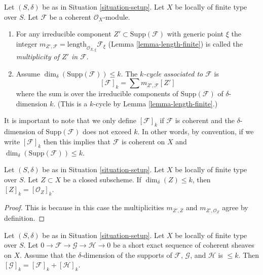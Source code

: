 \begin{definition}
\label{definition-cycle-associated-to-coherent-sheaf}
Let $(S, \delta)$ be as in Situation \ref{situation-setup}.
Let $X$ be locally of finite type over $S$.
Let $\mathcal{F}$ be a coherent $\mathcal{O}_X$-module.
\begin{enumerate}
\item For any irreducible component $Z' \subset \text{Supp}(\mathcal{F})$
with generic point $\xi$ the integer
$m_{Z', \mathcal{F}} = \text{length}_{\mathcal{O}_{X, \xi}} \mathcal{F}_\xi$
(Lemma \ref{lemma-length-finite})
is called the {\it multiplicity of $Z'$ in $\mathcal{F}$}.
\item Assume $\dim_\delta(\text{Supp}(\mathcal{F})) \leq k$.
The {\it $k$-cycle associated to $\mathcal{F}$} is
$$
[\mathcal{F}]_k
=
\sum m_{Z', \mathcal{F}}[Z']
$$
where the sum is over the irreducible components of
$\text{Supp}(\mathcal{F})$ of $\delta$-dimension $k$.
(This is a $k$-cycle by Lemma \ref{lemma-length-finite}.)
\end{enumerate}
\end{definition}

\noindent
It is important to note that we only define $[\mathcal{F}]_k$
if $\mathcal{F}$ is coherent and the $\delta$-dimension
of $\text{Supp}(\mathcal{F})$ does not exceed $k$. In other words,
by convention, if we write $[\mathcal{F}]_k$ then this implies that
$\mathcal{F}$ is coherent on $X$ and
$\dim_\delta(\text{Supp}(\mathcal{F})) \leq k$.

\begin{lemma}
\label{lemma-cycle-closed-coherent}
Let $(S, \delta)$ be as in Situation \ref{situation-setup}.
Let $X$ be locally of finite type over $S$.
Let $Z \subset X$ be a closed subscheme.
If $\dim_\delta(Z) \leq k$, then $[Z]_k = [{\mathcal O}_Z]_k$.
\end{lemma}

\begin{proof}
This is because in this case the multiplicities $m_{Z', Z}$ and
$m_{Z', \mathcal{O}_Z}$ agree by definition.
\end{proof}

\begin{lemma}
\label{lemma-additivity-sheaf-cycle}
Let $(S, \delta)$ be as in Situation \ref{situation-setup}.
Let $X$ be locally of finite type over $S$.
Let $0 \to \mathcal{F} \to \mathcal{G} \to \mathcal{H} \to 0$
be a short exact sequence of coherent sheaves on $X$.
Assume that the $\delta$-dimension of the supports
of $\mathcal{F}$, $\mathcal{G}$, and $\mathcal{H}$ is $\leq k$.
Then $[\mathcal{G}]_k = [\mathcal{F}]_k + [\mathcal{H}]_k$.
\end{lemma}

